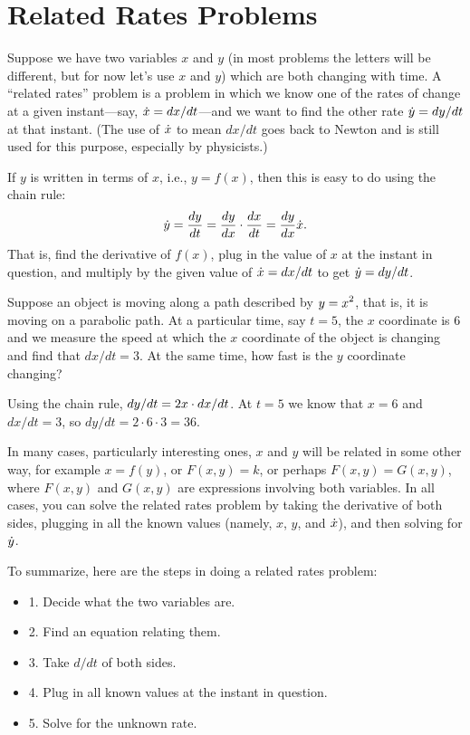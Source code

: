 \section{Related Rates Problems}

Suppose we have two variables $x$ and $y$ (in most problems the
letters will be different, but for now let's use $x$ and $y$) which
are both changing with time.  A ``related rates'' problem is a problem
in which we know one of the rates of change at a given instant---say,
$\displaystyle \dot x = dx/dt$---and we want to find the other rate $\displaystyle \dot y = dy/dt$ at that
instant. (The use of $\displaystyle \dot x$ 
to mean $dx/dt$ goes back to Newton and
is still used for this purpose, especially by physicists.)

If $y$ is written in terms of $x$, i.e., $y=f(x)$, then this is easy
to do using the chain rule:
$$
\dot y = {dy\over dt}={dy\over dx}\cdot{dx\over dt}={dy\over dx}\dot x.
$$
That is, find the derivative of $f(x)$, plug in the value of
$x$ at the instant in question, and multiply by the given value of
$\displaystyle \dot{x}=dx/dt$ to get $\displaystyle \dot{y}=dy/dt$.

\begin{example}
Suppose an object is moving along a path described by $\displaystyle y=x^2$, that
is, it is moving on a parabolic path. At a particular time, say $t=5$,
the $x$ coordinate is 6 and 
we measure the speed at which the $x$ coordinate of the object is
changing and find that $dx/dt = 3$. At the same time, how fast is the
$y$ coordinate changing?

Using the chain rule, $\displaystyle dy/dt = 2x\cdot dx/dt$. At $t=5$ we know that
$x=6$ and $dx/dt=3$, so $dy/dt = 2\cdot 6\cdot 3 = 36$.
\end{example}

In many cases, particularly interesting ones,
$x$ and $y$ will be related in some other way, for example
$x=f(y)$, or $F(x,y)=k$, or perhaps $F(x,y)=G(x,y)$, where $F(x,y)$
and $G(x,y)$ are expressions involving both variables.  In all cases, you
can solve the related rates problem by taking the derivative of both sides,
plugging in all the known values (namely, $x$, $y$, and $\displaystyle \dot{x}$), and
then solving for $\displaystyle \dot{y}$.

To summarize, here are the steps in doing a related rates problem:

\begin{itemize} %

\item{1.} Decide what the two variables are.
\item{2.}  Find an equation relating them.
\item{3.}  Take $d/dt$ of both sides.
\item{4.}  Plug in all known values at the instant in question.
\item{5.}  Solve for the unknown rate.

\end{itemize}

